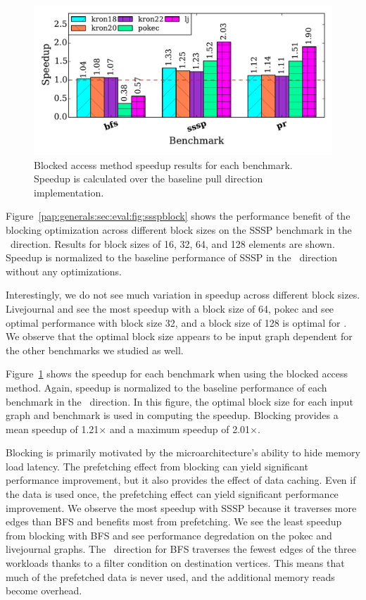 \begin{figure}[t]
    \centering
    \includegraphics[scale = 0.5]{graphit-figures/all-blocked.pdf}
    \caption{Blocked access method speedup results for each benchmark. Speedup is calculated over the baseline pull direction implementation.} %
    \label{pap:generals:sec:eval:fig:blocked}
\end{figure}
 
Figure~\ref{pap:generals:sec:eval:fig:ssspblock} shows the performance benefit of the blocking optimization across different block sizes on the SSSP benchmark in the \pull~direction. Results for block sizes of 16, 32, 64, and 128 elements are shown.
Speedup is normalized to the baseline performance of SSSP in the \pull~direction without any optimizations.
 
Interestingly, we do not see much variation in speedup across different block sizes. 
Livejournal and  see the most speedup with a block size of 64, pokec and  see optimal performance with block size 32, and a block size of 128 is optimal for . 
We observe that the optimal block size appears to be input graph dependent for the other benchmarks we studied as well. 
 
Figure~\ref{pap:generals:sec:eval:fig:blocked} shows the speedup for each benchmark when using the blocked access method. 
Again, speedup is normalized to the baseline performance of each benchmark in the \pull~direction.
In this figure, the optimal block size for each input graph and benchmark is used in computing the speedup. 
Blocking provides a mean speedup of 1.21$\times$ and a maximum speedup of 2.01$\times$. 
 
Blocking is primarily motivated by the microarchitecture's ability to hide memory load latency.
The prefetching effect from blocking can yield significant performance improvement, but it also provides the effect of data caching.
Even if the data is used once, the prefetching effect can yield significant performance improvement. 
We observe the most speedup with SSSP because it traverses more edges than BFS and benefits most from prefetching.
We see the least speedup from blocking with BFS and see performance degredation on the pokec and livejournal graphs.
The \pull~direction for BFS traverses the fewest edges of the three workloads thanks to a filter condition on destination vertices.
This means that much of the prefetched data is never used, and the additional memory reads become overhead.

